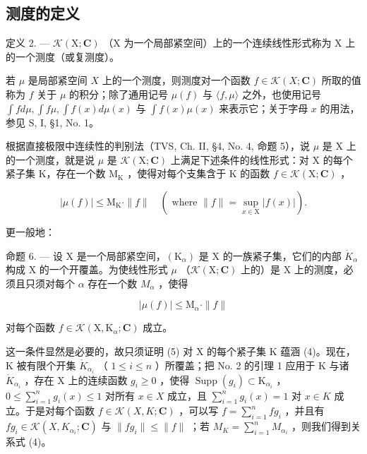 \subsection{测度的定义}

定义 2. --- \(\mathcal{K}(\mathrm{X};\mathbf{C})\) （\(\mathrm{X}\) 为一个局部紧空间）上的一个连续线性形式称为 \(\mathrm{X}\) 上的一个测度（或复测度）。

若 \(\mu\) 是局部紧空间 \(X\) 上的一个测度，则测度对一个函数 \(f \in \mathcal{K}(X; \mathbf{C})\) 所取的值称为 \(f\) 关于 \(\mu\) 的积分；除了通用记号 \(\mu(f)\) 与 \(\langle f, \mu \rangle\) 之外，也使用记号 \(\int f d\mu, \int f\mu, \int f(x) d\mu(x)\) 与 \(\int f(x)\mu(x)\) 来表示它；关于字母 \(x\) 的用法，参见 S, I, §1, No. 1。

根据直接极限中连续性的判别法（TVS, Ch. II, §4, No. 4, 命题 5），说 \(\mu\) 是 X 上的一个测度，就是说 \(\mu\) 是 \(\mathcal{K}(\mathrm{X};\mathbf{C})\) 上满足下述条件的线性形式：对 X 的每个紧子集 K，存在一个数 \(\mathrm{M_K}\) ，使得对每个支集含于 K 的函数 \(f\in \mathcal{K}(\mathrm{X};\mathbf{C})\) ，

\[
| \mu (f) | \leqslant \mathrm{M} _ {\mathrm{K}} \cdot \| f \| \quad (\text { where } \| f \| = \sup _ {x \in \mathrm{X}} | f (x) |).\tag{4}
\]

更一般地：

命题 6. --- 设 X 是一个局部紧空间，\((\mathrm{K}_{\alpha})\) 是 X 的一族紧子集，它们的内部 \(\mathring{K}_{\alpha}\) 构成 X 的一个开覆盖。为使线性形式 \(\mu\) （\(\mathcal{K}(\mathrm{X};\mathbf{C})\) 上的）是 X 上的测度，必须且只须对每个 \(\alpha\) 存在一个数 \(M_{\alpha}\) ，使得

\[
| \mu (f) | \leqslant \mathrm{M} _ {\alpha} \cdot \| f \|\tag{5}
\]

对每个函数 \(f \in \mathcal{K}(\mathrm{X}, \mathrm{K}_{\alpha}; \mathbf{C})\) 成立。

这一条件显然是必要的，故只须证明 (5) 对 X 的每个紧子集 K 蕴涵 (4)。现在，K 被有限个开集 \(\mathring{K}_{\alpha_{i}}\) （ \(1 \leqslant i \leqslant n\) ）所覆盖；把 No. 2 的引理 1 应用于 K 与诸 \(\mathring{K}_{\alpha_{i}}\) ，存在 X 上的连续函数 \(g_{i} \geqslant 0\) ，使得 \(\operatorname{Supp}(g_{i}) \subset \mathrm{K}_{\alpha_{i}}\) ，\(0 \leqslant \sum_{i=1}^{n} g_{i}(x) \leqslant 1\) 对所有 \(x \in X\) 成立，且 \(\sum_{i=1}^{n} g_{i}(x) = 1\) 对 \(x \in K\) 成立。于是对每个函数 \(f \in \mathcal{K}(X, K; \mathbf{C})\) ，可以写 \(f = \sum_{i=1}^{n} fg_{i}\) ，并且有 \(fg_{i} \in \mathcal{K}(X, K_{\alpha_{i}}; \mathbf{C})\) 与 \(\|fg_{i}\| \leqslant \|f\|\) ；若 \(M_{K} = \sum_{i=1}^{n} M_{\alpha_{i}}\) ，则我们得到关系式 (4)。

